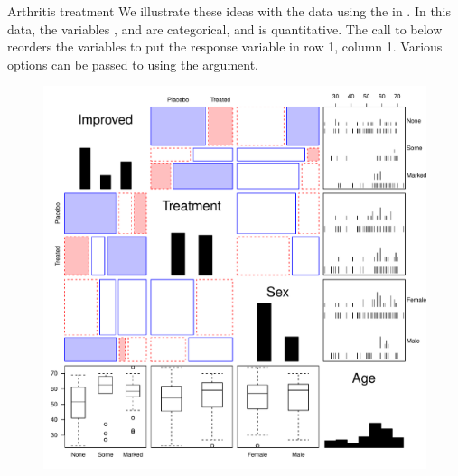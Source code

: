\documentclass[11pt]{book}
\renewenvironment{knitrout}{\small\renewcommand{\baselinestretch}{.85}}{} %
\begin{document}
\begin{Example}{Arthritis treatment}
We illustrate these ideas with the  data using the 
 in .
In this data, the variables ,  and  are
categorical, and  is quantitative.
The call to  below reorders the variables to put the response variable
 in row 1, column 1. Various options can be passed to 
using the  argument.
\begin{knitrout}
\color{fgcolor}\begin{kframe}
\begin{alltt}
\hlstd{(}\hlstd{,} \hlstd{=}\hlstd{)}
\hlstd{(Arthritis[,}\hlstd{(}\hlstd{,}\hlstd{,}\hlstd{,}\hlstd{)],}
       \hlstd{=}\hlstd{(} \hlstd{=} \hlstd{),}
       \hlstd{=}\hlstd{(}
                        \hlstd{=}\hlstd{(}\hlstd{=}\hlopt{:}\hlstd{)))}
\end{alltt}
\end{kframe}\begin{figure}[!htb]


\centerline{\includegraphics[width=.9\textwidth]{ch05/fig/arth-gpairs} }


\end{figure}
\end{knitrout}
\end{Example}
\end{document}
